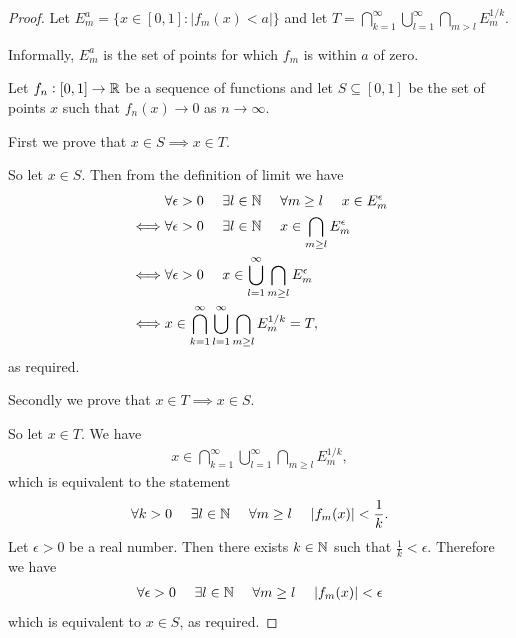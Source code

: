 \begin{proof}
  Let $E_m^a = \{x \in [0, 1] : |f_m(x) < a|\}$ and let $T = \bigcap_{k=1}^\infty \bigcup_{l=1}^\infty \bigcap_{m > l} E_m^{1/k}$.

  Informally, $E_m^a$ is the set of points for which $f_m$ is within $a$ of zero.

  Let $f_n: [0, 1] \to \mathbb{R}$ be a sequence of functions and let $S \subseteq [0, 1]$ be the set of points $x$
  such that $f_n(x) \to 0$ as $n \to \infty$.

  First we prove that $x \in S \implies x \in T$.

  So let $x \in S$. Then from the definition of limit we have
  \begin{align*}
    &\forall \epsilon>0 ~~~~ \exists l \in \mathbb{N} ~~~~ \forall m \geq l ~~~~  x \in E_m^\epsilon \\
    \iff &\forall \epsilon>0 ~~~~ \exists l \in \mathbb{N} ~~~~                        x \in \bigcap_{m \geq l} E_m^\epsilon \\
    \iff &\forall \epsilon>0 ~~~~                                              x \in \bigcup_{l=1}^\infty \bigcap_{m \geq l} E_m^\epsilon \\
    \iff &                                                              x \in \bigcap_{k=1}^\infty \bigcup_{l=1}^\infty \bigcap_{m \geq l} E_m^{1/k} = T,
  \end{align*}
  as required.

  Secondly we prove that $x \in T \implies x \in S$.

  So let $x \in T$. We have
  \begin{align*}
    x \in \bigcap_{k=1}^\infty \bigcup_{l=1}^\infty \bigcap_{m \geq l} E_m^{1/k},
  \end{align*}
  which is equivalent to the statement
  \begin{align*}
    \forall k>0 ~~~~ \exists l \in \mathbb{N} ~~~~ \forall m \geq l ~~~~  |f_m(x)| < \frac{1}{k}.
  \end{align*}
  Let $\epsilon > 0$ be a real number. Then there exists $k \in \mathbb{N}$ such that $\frac{1}{k} < \epsilon$. Therefore we have
  \begin{align*}
    \forall \epsilon>0 ~~~~ \exists l \in \mathbb{N} ~~~~ \forall m \geq l ~~~~  |f_m(x)| < \epsilon
  \end{align*}
  which is equivalent to $x \in S$, as required.
\end{proof}

